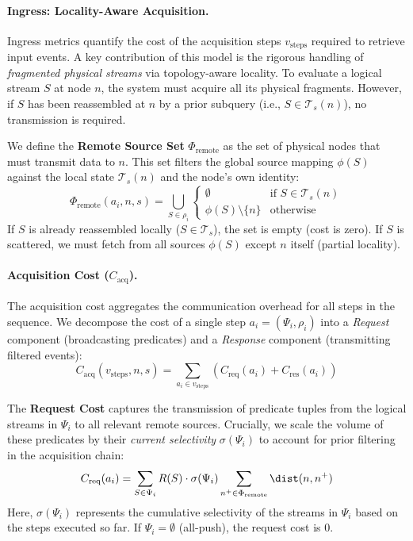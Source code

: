 \paragraph{Ingress: Locality-Aware Acquisition.}
Ingress metrics quantify the cost of the acquisition steps $v_{\text{steps}}$ required to retrieve input events.
A key contribution of this model is the rigorous handling of \emph{fragmented physical streams} via topology-aware locality.
To evaluate a logical stream $S$ at node $n$, the system must acquire all its physical fragments. However, if $S$ has been reassembled at $n$ by a prior subquery (i.e., $S \in \mathcal{T}_s(n)$), no transmission is required.

We define the \textbf{Remote Source Set} $\Phi_{\text{remote}}$ as the set of physical nodes that must transmit data to $n$. This set filters the global source mapping $\phi(S)$ against the local state $\mathcal{T}_s(n)$ and the node's own identity:
\begin{equation}\label{eq:remote_source_set}
    \Phi_{\text{remote}}(a_i, n, s) = \bigcup_{S \in \rho_i}
    \begin{cases}
        \emptyset & \text{if } S \in \mathcal{T}_s(n)\\
        \phi(S) \setminus \{n\} & \text{otherwise}
    \end{cases}
\end{equation}
If $S$ is already reassembled locally ($S \in \mathcal{T}_s$), the set is empty (cost is zero). If $S$ is scattered, we must fetch from all sources $\phi(S)$ except $n$ itself (partial locality).

\paragraph{Acquisition Cost ($C_{\text{acq}}$).}
The acquisition cost aggregates the communication overhead for all steps in the sequence. We decompose the cost of a single step $a_i = (\Psi_i, \rho_i)$ into a \emph{Request} component (broadcasting predicates) and a \emph{Response} component (transmitting filtered events):
\begin{equation}
    C_{\text{acq}}(v_{\text{steps}}, n, s) = \sum_{a_i \in v_{\text{steps}}} \left( C_{\text{req}}(a_i) + C_{\text{res}}(a_i) \right)
\end{equation}

The \textbf{Request Cost} captures the transmission of predicate tuples from the logical streams in $\Psi_i$ to all relevant remote sources. Crucially, we scale the volume of these predicates by their \emph{current selectivity} $\sigma(\Psi_i)$ to account for prior filtering in the acquisition chain:
\begin{equation}
    C_{\text{req}}(a_i) = \sum_{S \in \Psi_i} R(S) \cdot \sigma(\Psi_i) \sum_{n^+ \in \Phi_{\text{remote}}} \dist(n, n^+)
\end{equation}
Here, $\sigma(\Psi_i)$ represents the cumulative selectivity of the streams in $\Psi_i$ based on the steps executed so far. If $\Psi_i = \emptyset$ (all-push), the request cost is 0.

